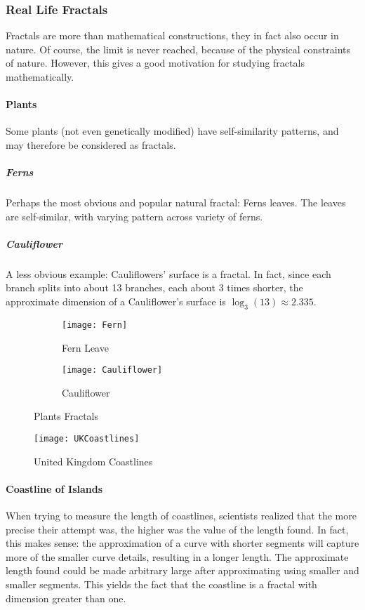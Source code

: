 \subsubsection{Real Life Fractals}
Fractals are more than mathematical constructions, they in fact also occur in nature.
Of course, the limit is never reached, because of the physical constraints of nature.
However, this gives a good motivation for studying fractals mathematically.

\paragraph{Plants}
Some plants (not even genetically modified) have self-similarity patterns, and may therefore be considered as fractals.


\subparagraph{Ferns}
Perhaps the most obvious and popular natural fractal: Ferns leaves.
The leaves are self-similar, with varying pattern across variety of ferns.

\subparagraph{Cauliflower}
A less obvious example: Cauliflowers' surface is a fractal.
In fact, since each branch splits into about 13 branches, each about 3 times shorter, the approximate dimension of a Cauliflower's surface is $\log_3(13) \approx 2.335$.

\begin{figure}[!h]
	\centering
	\begin{subfigure}{.49\textwidth}
		\texttt{[image: Fern]}
		\centering
		\captionsetup{justification=centering}
		\caption{Fern Leave}
		\label{fig:fern}
	\end{subfigure}
	\begin{subfigure}{.49\textwidth}
		\texttt{[image: Cauliflower]}
		\centering
		\captionsetup{justification=centering}
		\caption{Cauliflower}
		\label{fig:cauliflower}
	\end{subfigure}
	\caption{Plants Fractals}
	\label{fig:plantsFractals}
\end{figure}


\begin{wrapfigure}{r}{5.75cm}
	\texttt{[image: UKCoastlines]}
	\centering
	\caption{United Kingdom Coastlines}
	\label{fig:UKCoastlines}
\end{wrapfigure}
\paragraph{Coastline of Islands}
When trying to measure the length of coastlines, scientists realized that the more precise their attempt was, the higher was the value of the length found.
In fact, this makes sense: the approximation of a curve with shorter segments will capture more of the smaller curve details, resulting in a longer length.
The approximate length found could be made arbitrary large after approximating using smaller and smaller segments.
This yields the fact that the coastline is a fractal with dimension greater than one.

